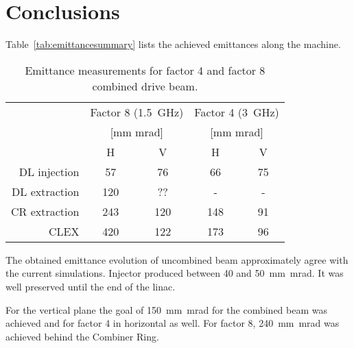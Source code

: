 \section{Conclusions}

Table~\ref{tab:emittancesummary} lists the achieved emittances along the machine.

\begin{table}[h]
 \centering
  \begin{tabular}{rcccc}
    \hline
    
                                 & \multicolumn{2}{c}{Factor 8 (1.5~GHz)} & \multicolumn{2}{c}{Factor 4 (3~GHz)} \\
    {\multirow{3}{*}{Location} } & \multicolumn{2}{c}{[mm mrad]}          & \multicolumn{2}{c}{[mm mrad]}        \\
                                 & H     &    V                           &      H         & V                \\
    \hline \hline
                   DL injection  & 57   & 76                              &  66 &  75 \\
                   DL extraction & 120  & ??                              & -   &  - \\
                   CR extraction & 243  & 120                             & 148 &  91 \\
                   CLEX          & 420  & 122                             & 173 &  96 \\

    \hline
  \end{tabular}
\caption{Emittance measurements for factor 4 and factor 8 combined drive beam.}
\end{table}


The obtained emittance evolution of uncombined beam approximately agree with the current simulations. 
Injector produced between 40 and 50~mm~mrad. It was well preserved until the end of the linac.



For the vertical plane the goal of 150~mm~mrad for the combined beam was achieved and 
for factor 4 in horizontal as well. For factor 8, 240~mm~mrad was achieved behind the Combiner Ring.



